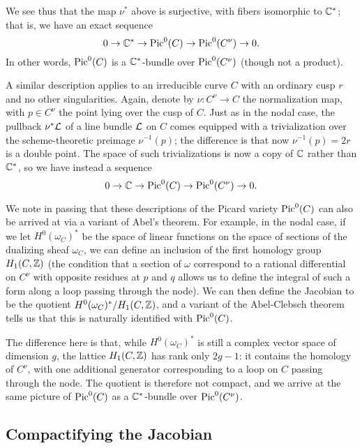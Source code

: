 We see thus that the map $\nu^*$ above is surjective, with fibers isomorphic to ${\mathbb C}^*$; that is, we have an exact sequence
$$
0 \to {\mathbb C}^* \to \operatorname{Pic}^0(C) \to \operatorname{Pic}^0(C^\nu) \to 0.
$$
In other words, $\operatorname{Pic}^0(C)$ is a ${\mathbb C}^*$-bundle over $\operatorname{Pic}^0(C^\nu)$ (though not a product). 

A similar description applies to an irreducible curve $C$ with an ordinary cusp $r$ and no other singularities. Again,  denote by $\nu : C^\nu \to C$ the normalization map, with $p \in C^\nu$ the point lying over the cusp of $C$. Just as in the nodal case, the pullback $\nu^*{\mathcal L}$ of a line bundle ${\mathcal L}$ on $C$ comes equipped with a trivialization over the scheme-theoretic preimage $\nu^{-1}(p)$; the difference is that now $\nu^{-1}(p) = 2r$ is a double point. The space of such trivializations is now a copy of ${\mathbb C}$ rather than ${\mathbb C}^*$, so we have instead a sequence
$$
0 \to {\mathbb C} \to \operatorname{Pic}^0(C) \to \operatorname{Pic}^0(C^\nu) \to 0.
$$

We note in passing that these descriptions of the Picard variety $\operatorname{Pic}^0(C)$ can also be arrived at via a variant of Abel's theorem. For example, in the nodal case, if we let $H^0(\omega_C)^*$ be the space of linear functions on the space of sections of the dualizing sheaf $\omega_C$, we can define an inclusion of the first homology group $H_1(C,{\mathbb Z})$ (the condition that a section of $\omega$ correspond to a rational differential on $C^\nu$ with opposite residues at $p$ and $q$ allows us to define the integral of such a form along a loop passing through the node).  
We can then define the Jacobian to be the quotient $H^0(\omega_C)^*/H_1(C,{\mathbb Z})$, and a variant of the Abel-Clebsch theorem tells us that this is naturally identified with $\operatorname{Pic}^0(C)$.

The difference here is that, while $H^0(\omega_C)^*$ is still a complex vector space of dimension $g$, the lattice $H_1(C,{\mathbb Z})$ has rank only $2g-1$: it contains the homology of $C^\nu$, with one additional generator corresponding to a loop on $C$ passing through the node. The quotient is therefore not compact, and we arrive at the same picture of $\operatorname{Pic}^0(C)$ as a ${\mathbb C}^*$-bundle over $\operatorname{Pic}^0(C^\nu)$. 

\subsection{Compactifying the Jacobian}

